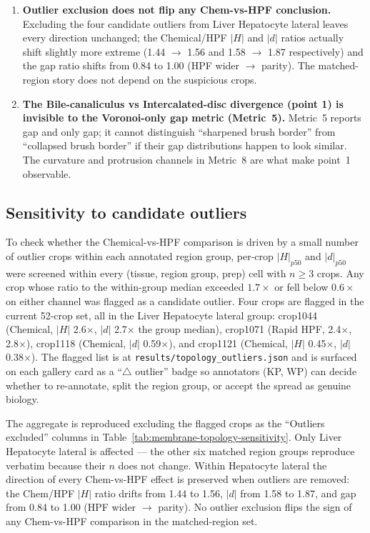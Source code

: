 \begin{enumerate}[nosep, leftmargin=*]
\item \textbf{Outlier exclusion does not flip any Chem-vs-HPF
conclusion.} Excluding the four candidate outliers from Liver
Hepatocyte lateral leaves every direction unchanged; the Chemical/HPF
$|H|$ and $|d|$ ratios actually shift slightly more extreme (1.44
$\to$ 1.56 and 1.58 $\to$ 1.87 respectively) and the gap ratio
shifts from 0.84 to 1.00 (HPF wider $\to$ parity). The
matched-region story does not depend on the suspicious crops.

\item \textbf{The Bile-canaliculus vs Intercalated-disc divergence
(point 1) is invisible to the Voronoi-only gap metric
(Metric~5).} Metric~5 reports gap and only gap; it cannot
distinguish ``sharpened brush border'' from ``collapsed brush
border'' if their gap distributions happen to look similar. The
curvature and protrusion channels in Metric~8 are what make point~1
observable.
\end{enumerate}

\subsection*{Sensitivity to candidate outliers}

To check whether the Chemical-vs-HPF comparison is driven by a small
number of outlier crops within each annotated region group, per-crop
$|H|_{p50}$ and $|d|_{p50}$ were screened within every (tissue, region
group, prep) cell with $n \geq 3$ crops. Any crop whose ratio to the
within-group median exceeded $1.7\times$ or fell below $0.6\times$ on
either channel was flagged as a candidate outlier. Four crops are
flagged in the current 52-crop set, all in the Liver Hepatocyte lateral
group: crop1044 (Chemical, $|H|$ 2.6$\times$, $|d|$ 2.7$\times$ the
group median), crop1071 (Rapid HPF, 2.4$\times$, 2.8$\times$), crop1118
(Chemical, $|d|$ 0.59$\times$), and crop1121 (Chemical, $|H|$
0.45$\times$, $|d|$ 0.38$\times$). The flagged list is at
\texttt{results/topology\_outliers.json} and is surfaced on each
gallery card as a ``$\triangle$ outlier'' badge so annotators
(KP, WP) can decide whether to re-annotate, split the region group,
or accept the spread as genuine biology.

The aggregate is reproduced excluding the flagged crops as the
``Outliers excluded'' columns in
Table~\ref{tab:membrane-topology-sensitivity}. Only Liver Hepatocyte
lateral is affected --- the other six matched region groups reproduce
verbatim because their $n$ does not change. Within Hepatocyte lateral
the direction of every Chem-vs-HPF effect is preserved when outliers
are removed: the Chem/HPF $|H|$ ratio drifts from 1.44 to 1.56, $|d|$
from 1.58 to 1.87, and gap from 0.84 to 1.00 (HPF wider $\rightarrow$
parity). No outlier exclusion flips the sign of any Chem-vs-HPF
comparison in the matched-region set.

